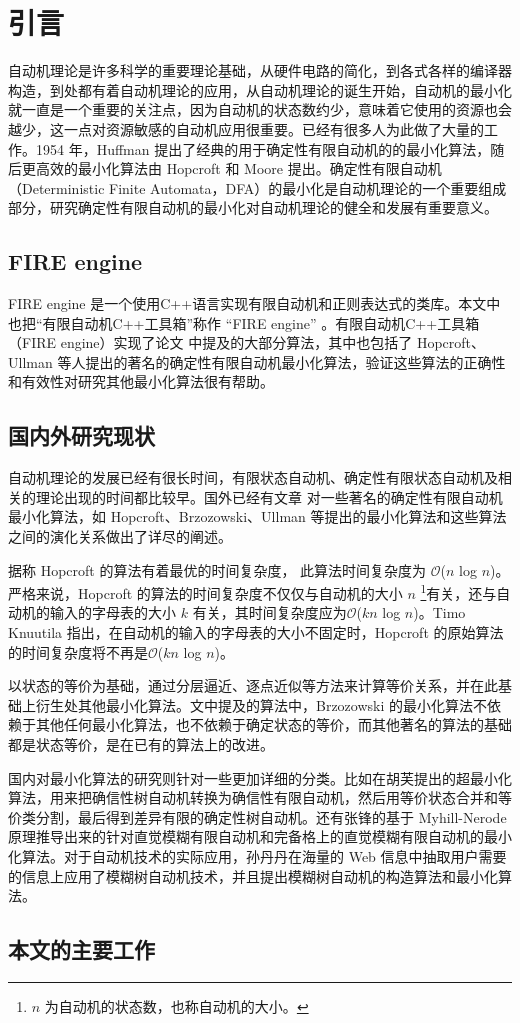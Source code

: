 \chapter{引言}
自动机理论是许多科学的重要理论基础，从硬件电路的简化，到各式各样的编译器构造，到处都有着自动机理论的应用，从自动机理论的诞生开始，自动机的最小化就一直是一个重要的关注点，因为自动机的状态数约少，意味着它使用的资源也会越少，这一点对资源敏感的自动机应用很重要。已经有很多人为此做了大量的工作。1954 年，Huffman 提出了经典的用于确定性有限自动机的的最小化算法\cite{HUFFMAN1954161}，随后更高效的最小化算法由 Hopcroft 和 Moore 提出。确定性有限自动机（Deterministic Finite Automata，DFA）的最小化是自动机理论的一个重要组成部分，研究确定性有限自动机的最小化对自动机理论的健全和发展有重要意义。

\section{FIRE engine}
FIRE engine \cite{watson1994design}是一个使用C++语言实现有限自动机和正则表达式的类库。本文中也把“有限自动机C++工具箱”称作 “FIRE engine” 。有限自动机C++工具箱（FIRE engine）实现了论文 \cite{watson1993taxonomya,watson1993taxonomyb} 中提及的大部分算法，其中也包括了 Hopcroft、Ullman 等人提出的著名的确定性有限自动机最小化算法，验证这些算法的正确性和有效性对研究其他最小化算法很有帮助。

\section{国内外研究现状}

自动机理论的发展已经有很长时间，有限状态自动机、确定性有限状态自动机及相关的理论出现的时间都比较早。国外已经有文章 \cite{watson1993taxonomyb} 对一些著名的确定性有限自动机最小化算法，如 Hopcroft、Brzozowski、Ullman 等提出的最小化算法和这些算法之间的演化关系做出了详尽的阐述。

据称 Hopcroft 的算法有着最优的时间复杂度， 此算法时间复杂度为 $\mathcal{O}$($n$ log $n$)\cite{Hopc71}。严格来说，Hopcroft 的算法的时间复杂度不仅仅与自动机的大小 $n$ \footnote{ $n$ 为自动机的状态数，也称自动机的大小。}有关，还与自动机的输入的字母表的大小 $k$ 有关，其时间复杂度应为$\mathcal{O}$($kn$ log $n$)。Timo Knuutila 指出，在自动机的输入的字母表的大小不固定时，Hopcroft 的原始算法的时间复杂度将不再是$\mathcal{O}$($kn$ log $n$)\cite{KNUUTILA2001333}。

以状态的等价为基础，通过分层逼近、逐点近似等方法来计算等价关系，并在此基础上衍生处其他最小化算法。文中提及的算法中，Brzozowski 的最小化算法不依赖于其他任何最小化算法，也不依赖于确定状态的等价，而其他著名的算法的基础都是状态等价，是在已有的算法上的改进\cite{watson1993taxonomyb}。

国内对最小化算法的研究则针对一些更加详细的分类。比如在胡芙提出的超最小化算法，用来把确信性树自动机转换为确信性有限自动机，然后用等价状态合并和等价类分割，最后得到差异有限的确定性树自动机\cite{hfTreeFA}。还有张锋的基于 Myhill-Nerode 原理推导出来的针对直觉模糊有限自动机和完备格上的直觉模糊有限自动机的最小化算法\cite{zf14Min}。对于自动机技术的实际应用，孙丹丹在海量的 Web 信息中抽取用户需要的信息上应用了模糊树自动机技术，并且提出模糊树自动机的构造算法和最小化算法\cite{sdd14}。 

\section{本文的主要工作}
